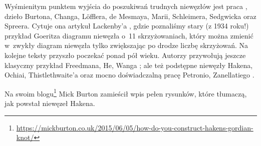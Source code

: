 Wyśmienitym punktem wyjścia do poszukiwań trudnych niewęzłów jest praca \cite{schleimer2021}, dzieło Burtona, Changa, Löfflera, de Mesmaya, Marii, Schleimera, Sedgwicka oraz Spreera.
%
%
%
%
%
%
%
%
Cytuje ona artykuł Lackenby'a \cite{lackenby2015}, gdzie poznaliśmy stary (z 1934 roku!) przykład Goeritza \cite{goeritz1934} diagramu niewęzła o~11 skrzyżowaniach, który można zmienić w~zwykły diagram niewęzła tylko zwiększając po drodze liczbę skrzyżowań.
%
%
Na kolejne teksty przyszło poczekać ponad pół wieku.
Autorzy przywołują jeszcze klasyczny przykład Freedmana, He, Wanga \cite{freedman1994}; ale też podstępne niewęzły Hakena, Ochiai, Thistlethwaite'a oraz mocno doświadczalną pracę Petronio, Zanellatiego \cite{zanellati2016}.
%
%
%
%
%
%


Na swoim blogu\footnote{\url{https://mickburton.co.uk/2015/06/05/how-do-you-construct-hakens-gordian-knot/}} Mick Burton zamieścił wpis pełen rysunków, które tłumaczą, jak powstał niewęzeł Hakena.

